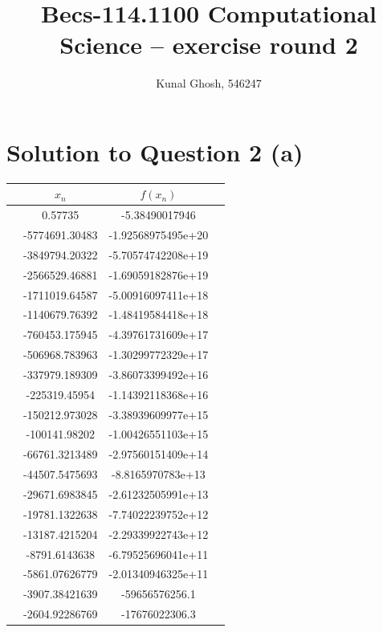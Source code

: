 \documentclass[a4paper,11pt]{article}
\begin{document}
\title{Becs-114.1100 Computational Science -- exercise round 2} %
\author{Kunal Ghosh, 546247} %
\maketitle
\section{Solution to Question 2 (a)}\label{prob2a}

\begin{center}
	\begin{table}[h!]
		\begin{tabular}{|c|c|c|c|}
			\hline
			& \textbf{$x_n$} & \textbf{$f(x_n)$} & \\
			\hline
			& 0.57735 & -5.38490017946 & \\
			& -5774691.30483 & -1.92568975495e+20 & \\
			& -3849794.20322 & -5.70574742208e+19 & \\
			& -2566529.46881 & -1.69059182876e+19 & \\
			& -1711019.64587 & -5.00916097411e+18 & \\
			& -1140679.76392 & -1.48419584418e+18 & \\
			& -760453.175945 & -4.39761731609e+17 & \\
			& -506968.783963 & -1.30299772329e+17 & \\
			& -337979.189309 & -3.86073399492e+16 & \\
			& -225319.45954 & -1.14392118368e+16 & \\
			& -150212.973028 & -3.38939609977e+15 & \\
			& -100141.98202 & -1.00426551103e+15 & \\
			& -66761.3213489 & -2.97560151409e+14 & \\
			& -44507.5475693 & -8.8165970783e+13 & \\
			& -29671.6983845 & -2.61232505991e+13 & \\
			& -19781.1322638 & -7.74022239752e+12 & \\
			& -13187.4215204 & -2.29339922743e+12 & \\
			& -8791.6143638 & -6.79525696041e+11 & \\
			& -5861.07626779 & -2.01340946325e+11 & \\
			& -3907.38421639 & -59656576256.1 & \\
			& -2604.92286769 & -17676022306.3 & \\

\end{tabular}
\end{table}
\end{center}
\end{document}
